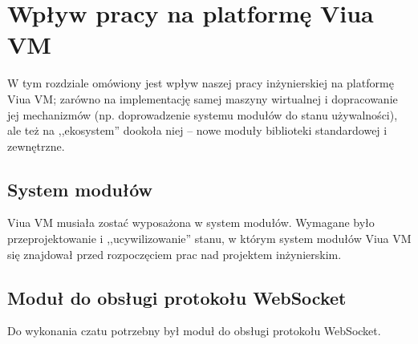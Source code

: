 \section{Wpływ pracy na platformę Viua VM}

W tym rozdziale omówiony jest wpływ naszej pracy inżynierskiej na platformę Viua VM; zarówno na implementację
samej maszyny wirtualnej i dopracowanie jej mechanizmów (np. doprowadzenie systemu modułów do stanu
używalności), ale też na ,,ekosystem'' dookoła niej -- nowe moduły biblioteki standardowej i zewnętrzne.

\subsection{System modułów}

Viua VM musiała zostać wyposażona w system modułów. Wymagane było przeprojektowanie i ,,ucywilizowanie''
stanu, w którym system modułów Viua VM się znajdował przed rozpoczęciem prac nad projektem inżynierskim.

\subsection{Moduł do obsługi protokołu WebSocket}

Do wykonania czatu potrzebny był moduł do obsługi protokołu WebSocket.
